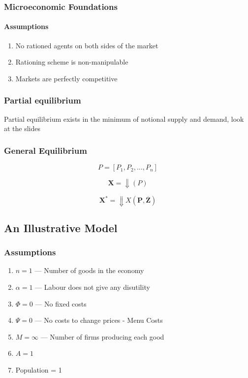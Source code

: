 \subsubsection*{Microeconomic Foundations}
\paragraph{Assumptions}
\begin{enumerate}
    \item No rationed agents on both sides of the market
    \item Rationing scheme is non-manipulable
    \item Markets are perfectly competitive
\end{enumerate}

\subsubsection*{Partial equilibrium}
Partial equilibrium exists in the minimum of notional supply and demand, look at the slides

\subsubsection*{General Equilibrium}

$$
P = \left[ P_1, P_2, \dots, P_n  \right]
$$

$$
\mathbf{X} = \Downarrow (P)
$$

$$
\mathbf{X^*} = \Downarrow X (\mathbf{P, \overline{Z}})
$$

\subsection*{An Illustrative Model}

\subsubsection*{Assumptions}
\begin{enumerate}
    \item $n = 1$ --- Number of goods in the economy
    \item $\alpha = 1$ --- Labour does not give any disutility
    \item $\Phi = 0$ --- No fixed costs
    \item $\Psi = 0$ --- No costs to change prices  - Menu Costs
    \item $M = \infty$ --- Number of firms producing each good
    \item $A = 1$
    \item Population = 1
\end{enumerate}

